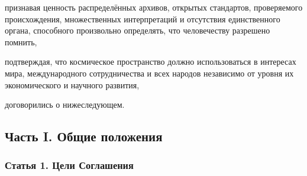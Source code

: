 \documentclass[
  russian,
  11pt,
  a4paper,
]{article}
\begin{document}
признавая ценность распределённых архивов, открытых стандартов,
проверяемого происхождения, множественных интерпретаций и отсутствия
единственного органа, способного произвольно определять, что
человечеству разрешено помнить,

подтверждая, что космическое пространство должно использоваться в
интересах мира, международного сотрудничества и всех народов независимо
от уровня их экономического и научного развития,

договорились о нижеследующем.

\subsection{Часть I. Общие
положения}\label{ux447ux430ux441ux442ux44c-i-ux43eux431ux449ux438ux435-ux43fux43eux43bux43eux436ux435ux43dux438ux44f}

\subsubsection{Статья 1. Цели
Соглашения}\label{ux441ux442ux430ux442ux44cux44f-1-ux446ux435ux43bux438-ux441ux43eux433ux43bux430ux448ux435ux43dux438ux44f}
\end{document}
